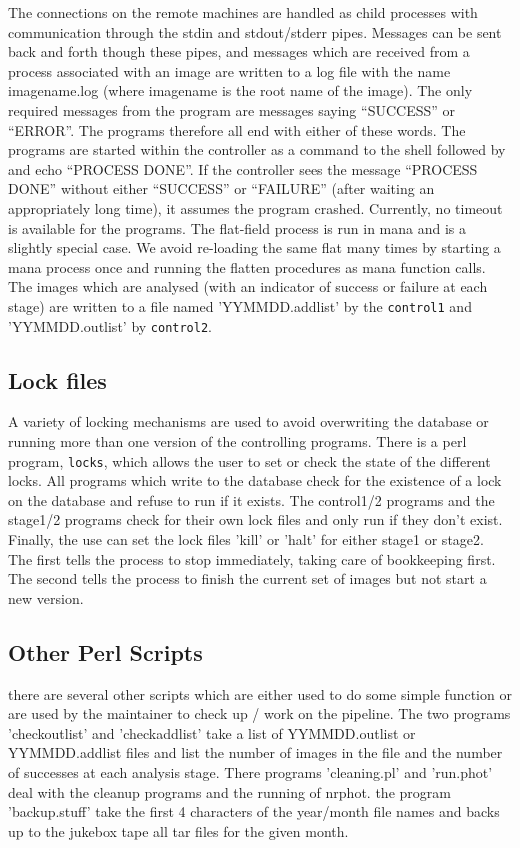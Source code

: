 \documentclass{article}
\begin{document}
The connections on the remote machines are handled as child processes
with communication through the stdin and stdout/stderr pipes.
Messages can be sent back and forth though these pipes, and messages
which are received from a process associated with an image are written
to a log file with the name imagename.log (where imagename is the root
name of the image).  The only required messages from the program are
messages saying ``SUCCESS'' or ``ERROR''.  The programs therefore all
end with either of these words.  The programs are started within the
controller as a command to the shell followed by and echo ``PROCESS
DONE''.  If the controller sees the message ``PROCESS DONE'' without
either ``SUCCESS'' or ``FAILURE'' (after waiting an appropriately long
time), it assumes the program crashed.  Currently, no timeout is
available for the programs.  The flat-field process is run in mana and
is a slightly special case.  We avoid re-loading the same flat many
times by starting a mana process once and running the flatten
procedures as mana function calls.  The images which are analysed
(with an indicator of success or failure at each stage) are written to
a file named 'YYMMDD.addlist' by the {\tt control1} and 'YYMMDD.outlist'
by {\tt control2}.

\subsection{Lock files}

A variety of locking mechanisms are used to avoid overwriting the
database or running more than one version of the controlling
programs.  There is a perl program, {\tt locks}, which allows the user to
set or check the state of the different locks. All programs which
write to the database check for the existence of a lock on the
database and refuse to run if it exists.  The control1/2 programs and the
stage1/2 programs check for their own lock files and only run if they
don't exist.  Finally, the use can set the lock files 'kill' or 'halt'
for either stage1 or stage2.  The first tells the process to stop
immediately, taking care of bookkeeping first.  The second tells the
process to finish the current set of images but not start a new
version.  

\subsection{Other Perl Scripts} 

there are several other scripts which are either used to do some
simple function or are used by the maintainer to check up / work on
the pipeline.  The two programs 'checkoutlist' and 'checkaddlist' take
a list of YYMMDD.outlist or YYMMDD.addlist files and list the number
of images in the file and the number of successes at each analysis
stage.  There programs 'cleaning.pl' and 'run.phot' deal with the
cleanup programs and the running of nrphot.  the program
'backup.stuff' take the first 4 characters of the year/month file
names and backs up to the jukebox tape all tar files for the given
month.
\end{document}
